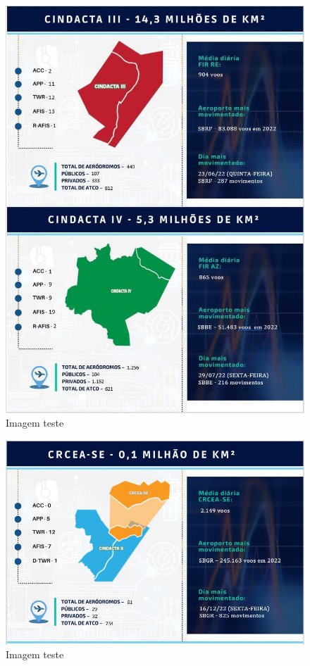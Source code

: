\documentclass[
]{book}
\theoremstyle{definition}
\theoremstyle{definition}
\theoremstyle{definition}
\theoremstyle{definition}
\theoremstyle{remark}
\begin{document}
\begin{figure}
\centering
\includegraphics{imagens/fig4.jpg}
\caption{Imagem teste}
\end{figure}

\begin{figure}
\centering
\includegraphics{imagens/fig5.jpg}
\caption{Imagem teste}
\end{figure}
\end{document}
